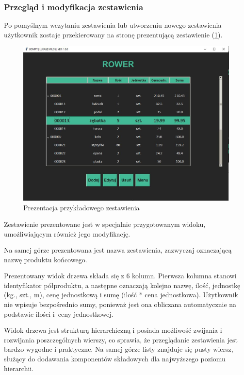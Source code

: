 \documentclass[12pt,twoside]{article}
\begin{document}
\subsubsection*{Przegląd i modyfikacja zestawienia}
Po pomyślnym wczytaniu zestawienia lub utworzeniu nowego zestawienia użytkownik zostaje przekierowany na stronę prezentującą zestawienie (\ref{fig:app:bom_presentation}).

\begin{figure}[h]
	\centering
	\includegraphics[width=\textwidth]{figures/app/bom_presentation.jpg}
	\caption{Prezentacja przykładowego zestawienia}
\label{fig:app:bom_presentation}
\end{figure}

Zestawienie prezentowane jest w specjalnie przygotowanym widoku, umożliwiającym również jego modyfikację.

Na samej górze prezentowana jest nazwa zestawienia, zazwyczaj oznaczającą nazwę produktu końcowego.

Prezentowany widok drzewa składa się z 6 kolumn. Pierwsza kolumna stanowi identyfikator półproduktu, a następne oznaczają kolejno nazwę, ilość, jednostkę (kg., szt., m), cenę jednostkową i sumę (ilość * cena jednostkowa). Użytkownik nie wpisuje bezpośrednio sumy, ponieważ jest ona obliczana automatycznie na podstawie ilości i~ceny jednostkowej.

Widok drzewa jest strukturą hierarchiczną i posiada możliwość zwijania i rozwijania poszczególnych wierszy, co sprawia, że przeglądanie zestawienia jest bardzo wygodne i praktyczne. Na samej górze listy znajduje się pusty wiersz, służący do dodawania komponentów składowych dla najwyższego poziomu hierarchii. 
\end{document}

